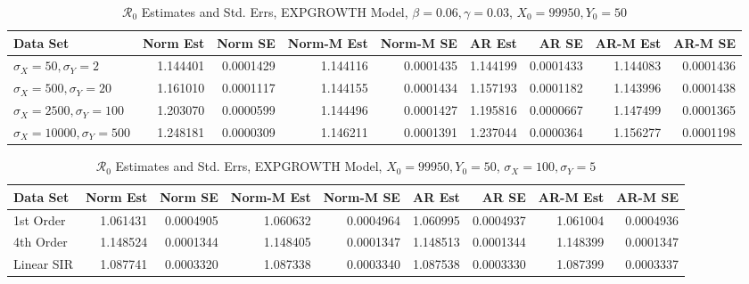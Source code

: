 \message{ !name(draft_v13.tex)}\documentclass[12pt]{article}
\newcommand{\rr}{\ensuremath{\mathcal{R}_0}}
\begin{document}
\begin{table}[H]
	
	\caption{\label{tab:}$\rr$ Estimates and Std. Errs, EXPGROWTH Model,
		$\beta = 0.06, \gamma = 0.03$, $X_0 = 99950, Y_0 = 50$}
	\centering
	\begin{tabular}[t]{l|r|r|r|r|r|r|r|r}
		\hline
		Data Set & Norm Est & Norm SE & Norm-M Est & Norm-M SE & AR Est & AR SE & AR-M Est & AR-M SE\\
		\hline
		$\sigma_X = 50, \sigma_Y = 2$ & 1.144401 & 0.0001429 & 1.144116 & 0.0001435 & 1.144199 & 0.0001433 & 1.144083 & 0.0001436\\
		\hline
		$\sigma_X = 500, \sigma_Y = 20$ & 1.161010 & 0.0001117 & 1.144155 & 0.0001434 & 1.157193 & 0.0001182 & 1.143996 & 0.0001438\\
		\hline
		$\sigma_X = 2500, \sigma_Y = 100$ & 1.203070 & 0.0000599 & 1.144496 & 0.0001427 & 1.195816 & 0.0000667 & 1.147499 & 0.0001365\\
		\hline
		$\sigma_X = 10000, \sigma_Y = 500$ & 1.248181 & 0.0000309 & 1.146211 & 0.0001391 & 1.237044 & 0.0000364 & 1.156277 & 0.0001198\\
		\hline
	\end{tabular}
\end{table}

\begin{table}[H]
	
	\caption{\label{tab:}$\rr$ Estimates and Std. Errs, EXPGROWTH Model,
		$X_0 = 99950, Y_0 = 50$, $\sigma_X = 100, \sigma_Y = 5$}
	\centering
	\begin{tabular}[t]{l|r|r|r|r|r|r|r|r}
		\hline
		Data Set & Norm Est & Norm SE & Norm-M Est & Norm-M SE & AR Est & AR SE & AR-M Est & AR-M SE\\
		\hline
		1st Order & 1.061431 & 0.0004905 & 1.060632 & 0.0004964 & 1.060995 & 0.0004937 & 1.061004 & 0.0004936\\
		\hline
		4th Order & 1.148524 & 0.0001344 & 1.148405 & 0.0001347 & 1.148513 & 0.0001344 & 1.148399 & 0.0001347\\
		\hline
		Linear SIR & 1.087741 & 0.0003320 & 1.087338 & 0.0003340 & 1.087538 & 0.0003330 & 1.087399 & 0.0003337\\
		\hline
	\end{tabular}
\end{table}
\end{document}
